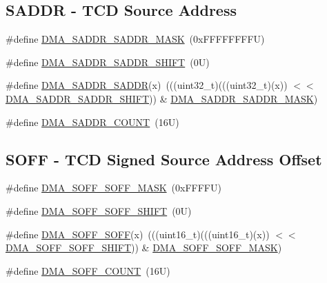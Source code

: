 \subsection*{S\+A\+D\+DR -\/ T\+CD Source Address}
\begin{DoxyCompactItemize}
\item 
\#define \mbox{\hyperlink{group___d_m_a___register___masks_ga3dbf7c2ee61861c859e0cb3a420a77f8}{D\+M\+A\+\_\+\+S\+A\+D\+D\+R\+\_\+\+S\+A\+D\+D\+R\+\_\+\+M\+A\+SK}}~(0x\+F\+F\+F\+F\+F\+F\+F\+F\+U)
\item 
\#define \mbox{\hyperlink{group___d_m_a___register___masks_ga02af13fd09f7b39e0fbbbb8e28ddcf4d}{D\+M\+A\+\_\+\+S\+A\+D\+D\+R\+\_\+\+S\+A\+D\+D\+R\+\_\+\+S\+H\+I\+FT}}~(0\+U)
\item 
\#define \mbox{\hyperlink{group___d_m_a___register___masks_gaed2c0dfa4b40da7d754af68651980303}{D\+M\+A\+\_\+\+S\+A\+D\+D\+R\+\_\+\+S\+A\+D\+DR}}(x)~(((uint32\+\_\+t)(((uint32\+\_\+t)(x)) $<$$<$ \mbox{\hyperlink{group___d_m_a___register___masks_ga02af13fd09f7b39e0fbbbb8e28ddcf4d}{D\+M\+A\+\_\+\+S\+A\+D\+D\+R\+\_\+\+S\+A\+D\+D\+R\+\_\+\+S\+H\+I\+FT}})) \& \mbox{\hyperlink{group___d_m_a___register___masks_ga3dbf7c2ee61861c859e0cb3a420a77f8}{D\+M\+A\+\_\+\+S\+A\+D\+D\+R\+\_\+\+S\+A\+D\+D\+R\+\_\+\+M\+A\+SK}})
\item 
\#define \mbox{\hyperlink{group___d_m_a___register___masks_ga1ae2bf524a2f47d0c567201c58375f0b}{D\+M\+A\+\_\+\+S\+A\+D\+D\+R\+\_\+\+C\+O\+U\+NT}}~(16\+U)
\end{DoxyCompactItemize}
\subsection*{S\+O\+FF -\/ T\+CD Signed Source Address Offset}
\begin{DoxyCompactItemize}
\item 
\#define \mbox{\hyperlink{group___d_m_a___register___masks_ga2bca88a49fda82f9a61bb3d832a9c156}{D\+M\+A\+\_\+\+S\+O\+F\+F\+\_\+\+S\+O\+F\+F\+\_\+\+M\+A\+SK}}~(0x\+F\+F\+F\+F\+U)
\item 
\#define \mbox{\hyperlink{group___d_m_a___register___masks_ga79f435a1aaf18a307644638b20599a9e}{D\+M\+A\+\_\+\+S\+O\+F\+F\+\_\+\+S\+O\+F\+F\+\_\+\+S\+H\+I\+FT}}~(0\+U)
\item 
\#define \mbox{\hyperlink{group___d_m_a___register___masks_ga17c965464f8707b527e21600d136c450}{D\+M\+A\+\_\+\+S\+O\+F\+F\+\_\+\+S\+O\+FF}}(x)~(((uint16\+\_\+t)(((uint16\+\_\+t)(x)) $<$$<$ \mbox{\hyperlink{group___d_m_a___register___masks_ga79f435a1aaf18a307644638b20599a9e}{D\+M\+A\+\_\+\+S\+O\+F\+F\+\_\+\+S\+O\+F\+F\+\_\+\+S\+H\+I\+FT}})) \& \mbox{\hyperlink{group___d_m_a___register___masks_ga2bca88a49fda82f9a61bb3d832a9c156}{D\+M\+A\+\_\+\+S\+O\+F\+F\+\_\+\+S\+O\+F\+F\+\_\+\+M\+A\+SK}})
\item 
\#define \mbox{\hyperlink{group___d_m_a___register___masks_gac557695037d19b7f09218d1b0dea82ec}{D\+M\+A\+\_\+\+S\+O\+F\+F\+\_\+\+C\+O\+U\+NT}}~(16\+U)
\end{DoxyCompactItemize}
